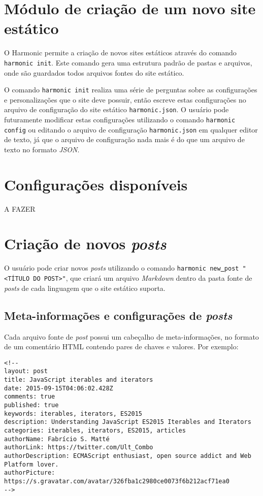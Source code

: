 \documentclass[ppginf, pep]{esinucpel}
\newcommand{\code}[1]{\texttt{#1}}
\begin{document}
\section{Módulo de criação de um novo site estático}

O Harmonic permite a criação de novos sites estáticos através do comando \code{harmonic init}. Este comando gera uma estrutura padrão de pastas e arquivos, onde são guardados todos arquivos fontes do site estático.

O comando \code{harmonic init} realiza uma série de perguntas sobre as configurações e personalizações que o site deve possuir, então escreve estas configurações no arquivo de configuração do site estático \code{harmonic.json}. O usuário pode futuramente modificar estas configurações utilizando o comando \code{harmonic config} ou editando o arquivo de configuração \code{harmonic.json} em qualquer editor de texto, já que o arquivo de configuração nada mais é do que um arquivo de texto no formato \emph{JSON}.


\section{Configurações disponíveis}

A FAZER

\section{Criação de novos \textit{posts}}

O usuário pode criar novos \textit{posts} utilizando o comando \code{harmonic new\underline{ }post "\textless TÍTULO DO POST\textgreater"}, que criará um arquivo \emph{Markdown} dentro da pasta fonte de \textit{posts} de cada linguagem que o site estático suporta.

\subsection{Meta-informações e configurações de \textit{posts}}

Cada arquivo fonte de \textit{post} possui um cabeçalho de meta-informações, no formato de um comentário HTML contendo pares de chaves e valores. Por exemplo:

\lstset{language=HTML}
\begin{lstlisting}
<!--
layout: post
title: JavaScript iterables and iterators
date: 2015-09-15T04:06:02.428Z
comments: true
published: true
keywords: iterables, iterators, ES2015
description: Understanding JavaScript ES2015 Iterables and Iterators
categories: iterables, iterators, ES2015, articles
authorName: Fabrício S. Matté
authorLink: https://twitter.com/Ult_Combo
authorDescription: ECMAScript enthusiast, open source addict and Web Platform lover.
authorPicture: https://s.gravatar.com/avatar/326fba1c2980ce0073f6b212acf71ea0
-->
\end{lstlisting}
\end{document}
